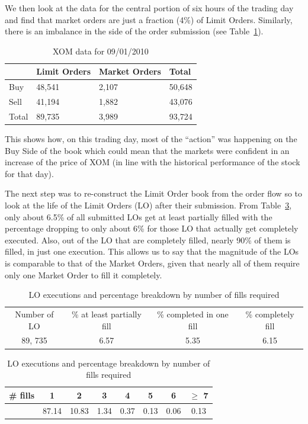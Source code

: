 We then look at the data for the central portion of six hours of the trading day and find that market orders are just a fraction (4\%) of Limit Orders. Similarly, there is an imbalance in the side of the order submission (see Table~\ref{tab:xom}). 
	\begin{table}[!ht]
	\centering
	\caption{XOM data for 09/01/2010\label{tab:xom}}
	\begin{tabular}{llll} 
	& Limit Orders & Market Orders & Total \\ \hline
	Buy & 48,541 & 2,107 & 50,648 \\ 
	Sell & 41,194 & 1,882 & 43,076 \\
	Total & 89,735 & 3,989 & 93,724
	\end{tabular}
	\end{table}
This shows how, on this trading day, most of the ``action'' was happening on the Buy Side of the book which could mean that the markets were confident in an increase of the price of XOM (in line with the historical performance of the stock for that day).


The next step was to re-construct the Limit Order book from the order flow so to look at the life of the Limit Orders (LO) after their submission. From Table~\ref{tab:LOexec}, only about 6.5\% of all submitted LOs get at least partially filled with the percentage dropping to only about 6\% for those LO that actually get completely executed. Also, out of the LO that are completely filled, nearly 90\% of them is filled, in just one execution. This allows us to say that the magnitude of the LOs is comparable to that of the Market Orders, given that nearly all of them require only one Market Order to fill it completely. 
	\begin{table}[!ht]
	\centering
	\caption{LO executions and percentage breakdown by number of fills required \label{tab:LOexec}}
	\begin{tabular}{cccc}
	Number of LO & \% at least partially fill & \% completed in one fill & \% completely fill \\
	89, 735 & 6.57 & 5.35 & 6.15
	\end{tabular}
	\begin{tabular}{cccccccc}
	\# fills & 1 & 2 & 3 & 4 & 5 & 6 & $\geq$ 7 \\ \hline
	& 87.14 & 10.83 & 1.34 & 0.37 & 0.13 & 0.06 & 0.13
	\end{tabular}
	\end{table}


